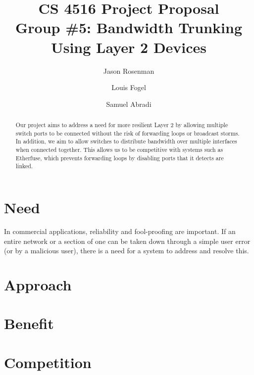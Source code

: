 \documentclass{article}
\title{CS 4516 Project Proposal\\Group \#5: Bandwidth Trunking Using Layer 2 Devices}
\author{Jason Rosenman \and Louis Fogel \and Samuel Abradi}
\date{}
\begin{document}
\maketitle
\begin{abstract}
	Our project aims to address a need for more resilient Layer 2 by allowing multiple switch ports to be connected without the risk of forwarding loops or broadcast storms.
	In addition, we aim to allow switches to distribute bandwidth over multiple interfaces when connected together.
	This allows us to be competitive with systems such as Etherfuse, which prevents forwarding loops by disabling ports that it detects are linked.
\end{abstract}
\section{Need}
	In commercial applications, reliability and fool-proofing are important.
	If an entire network or a section of one can be taken down through a simple user error (or by a malicious user), there is a need for a system to address and resolve this.
\section{Approach}
\section{Benefit}
\section{Competition}
\end{document}
